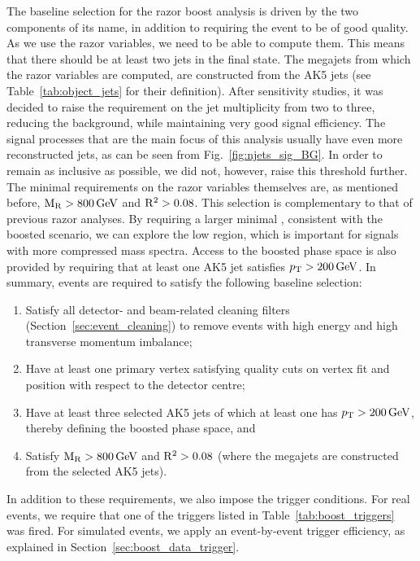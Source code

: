 
The baseline selection for the razor boost analysis is driven by the two components of its name, in
addition to requiring the event to be of good quality.
As we use the razor variables, we need to be able to compute them. This means that there should be
at least two jets in the final state. The megajets from which the razor variables are computed, are
constructed from the AK5 jets (see Table~\ref{tab:object_jets} for their definition).  
After sensitivity studies, it was decided to raise the requirement on the jet multiplicity from two
to three, reducing the background, while maintaining very good signal efficiency. The signal
processes that are the main focus of this analysis usually have even more reconstructed jets, as
can be seen from Fig.~\ref{fig:njets_sig_BG}. In order to remain as inclusive as possible, we did
not, however, raise this threshold further.
The minimal requirements on the razor variables themselves are, as mentioned before, $\mathrm{M_R} > 800\,\text{Ge\hspace{-.08em}V}$
and $\mathrm{R^2} > 0.08$.
This selection is complementary to that of previous razor analyses. By requiring a larger
minimal \mr, consistent with the boosted scenario, we can explore the low \rsq region, which is
important for signals with more compressed mass spectra.
Access to the boosted phase space is also provided by requiring that at least one AK5
jet satisfies $p_{\mathrm{T}} > 200\,\text{Ge\hspace{-.08em}V}$.
In summary, events are required to satisfy the following baseline selection:
\begin{enumerate}
 \item Satisfy all detector- and beam-related cleaning filters (Section~\ref{sec:event_cleaning}) to
remove events with high energy and high transverse momentum imbalance;
 \item Have at least one primary vertex satisfying quality cuts on vertex fit and position with
respect to the detector centre;
 \item Have at least three selected AK5 jets of which at least one has  $p_{\mathrm{T}} > 200\,\text{Ge\hspace{-.08em}V}$, thereby
 defining the boosted phase space, and
 \item Satisfy $\mathrm{M_R} > 800\,\text{Ge\hspace{-.08em}V}$ and $\mathrm{R^2} > 0.08$ (where the megajets are
constructed from the selected AK5 jets).
\end{enumerate}
In addition to these requirements, we also impose the trigger conditions. 
For real events, we require that one of the triggers listed in Table~\ref{tab:boost_triggers} was
fired. 
For simulated events, we apply an event-by-event trigger efficiency, as explained in
Section~\ref{sec:boost_data_trigger}. 

